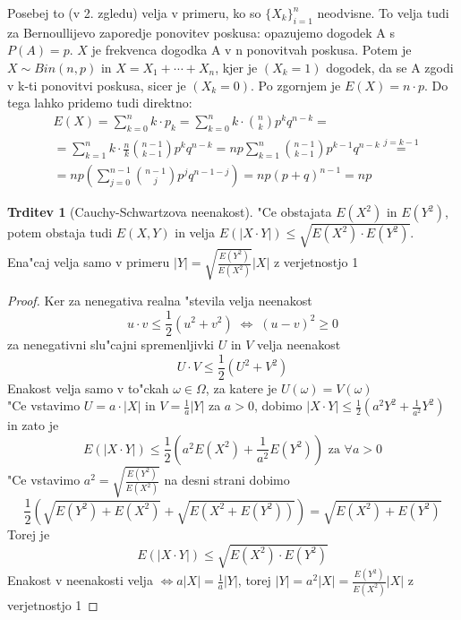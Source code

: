 \documentclass[a4paper,12pt]{article}
\theoremstyle{definition}
\newtheorem{claim}[counter]{Trditev}
\theoremstyle{remark}
\begin{document}
Posebej to (v 2. zgledu) velja v primeru, ko so $\{X_k\}_{i=1}^n$ neodvisne. To velja tudi za Bernoullijevo zaporedje
ponovitev poskusa: opazujemo dogodek A s $P(A) = p$. $X$ je frekvenca dogodka A v n ponovitvah poskusa. Potem je
$X \sim Bin(n,p)$ in $X = X_1 + \cdots + X_n$, kjer je $(X_k=1)$ dogodek, da se A zgodi v k-ti ponovitvi poskusa,
sicer je $(X_k=0)$. Po zgornjem je $E(X) = n \cdot p$. Do tega lahko pridemo tudi direktno:
\begin{align*}
    &E(X) = \sum_{k=0}^{n} k \cdot p_k = \sum_{k=0}^{n} k \cdot \binom{n}{k} p^k q^{n-k} = \\
    &= \sum_{k=1}^{n} k \cdot \frac{n}{k} \binom{n-1}{k-1} p^k q^{n-k} =
        np \sum_{k=1}^{n} \binom{n-1}{k-1} p^{k-1} q^{n-k} \stackrel{j=k-1}{=} \\
    &= np (\sum_{j=0}^{n-1} \binom{n-1}{j} p^j q^{n-1-j}) = np (p+q)^{n-1} = np
\end{align*}

\begin{claim}[Cauchy-Schwartzova neenakost]
    "Ce obstajata $E(X^2)$ in $E(Y^2)$, potem obstaja tudi $E(X,Y)$ in velja $E(|X \cdot Y|) \leq \sqrt{E(X^2) \cdot E(Y^2)}$.
    Ena"caj velja samo v primeru $|Y| = \sqrt{\frac{E(Y^2)}{E(X^2)}}|X|$ z verjetnostjo 1
\end{claim}

\begin{proof}
    Ker za nenegativa realna "stevila velja neenakost
    \begin{equation*}
        u \cdot v \leq \frac{1}{2}(u^2 + v^2) \; \iff \; (u-v)^2 \geq 0
    \end{equation*}
    za nenegativni slu"cajni spremenljivki $U$ in $V$ velja neenakost
    \begin{equation*}
        U \cdot V \leq \frac{1}{2}(U^2 + V^2)
    \end{equation*}
    Enakost velja samo v to"ckah $\omega \in \Omega$, za katere je $U(\omega) = V(\omega)$ \\
    "Ce vstavimo $U = a \cdot |X|$ in $V = \frac{1}{a}|Y|$ za $a > 0$, dobimo
    $|X \cdot Y| \leq \frac{1}{2} (a^2 Y^2 + \frac{1}{a^2}Y^2)$ in zato je
    \begin{equation}
        E(|X \cdot Y|) \leq \frac{1}{2} (a^2 E(X^2) + \frac{1}{a^2} E(Y^2)) \text{ za } \forall a > 0
    \end{equation}
    "Ce vstavimo $a^2 = \sqrt{\frac{E(Y^2)}{E(X^2)}}$ na desni strani dobimo
    \begin{equation*}
        \frac{1}{2} (\sqrt{E(Y^2) + E(X^2)} + \sqrt{E(X^2 + E(Y^2))}) = \sqrt{E(X^2) + E(Y^2)}
    \end{equation*}
    Torej je
    \begin{equation*}
        E(|X \cdot Y|) \leq \sqrt{E(X^2) \cdot E(Y^2)}
    \end{equation*}
    Enakost v neenakosti velja $\iff a |X| = \frac{1}{a} |Y|$, torej $|Y| = a^2 |X| = \frac{E(Y^2)}{E(X^2)} |X|$
    z verjetnostjo 1
\end{proof}
\end{document}
